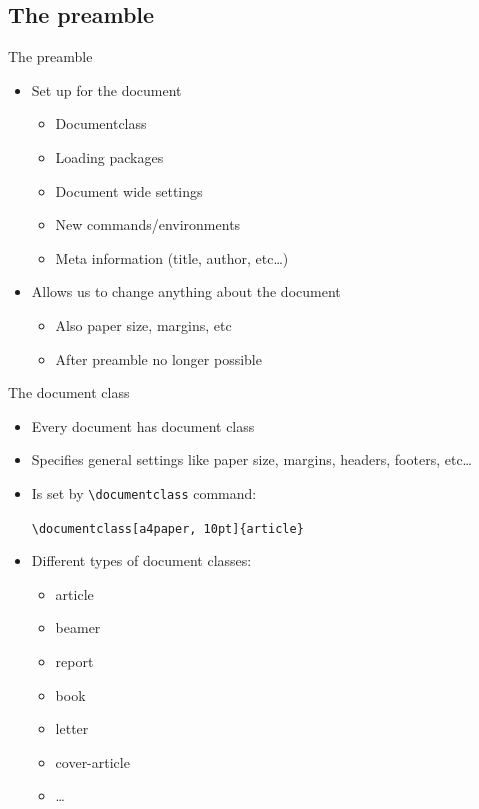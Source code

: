 \documentclass{beamer}
\begin{document}
\subsection{The preamble}
\begin{frame}{The preamble}
    \begin{itemize}
        \item Set up for the document
            \begin{itemize}
                \item Documentclass
                \item Loading packages
                \item Document wide settings
                \item New commands/environments
                \item Meta information (title, author, etc\ldots)
            \end{itemize}
        \item Allows us to change anything about the document
            \begin{itemize}
                \item Also paper size, margins, etc
                \item After preamble no longer possible
            \end{itemize}
    \end{itemize}
\end{frame}

\begin{frame}[fragile]{The document class}
    \begin{itemize}
        \item Every document has document class
        \item Specifies general settings like paper size, margins, headers,
            footers, etc\ldots
        \item Is set by \lstinline+\documentclass+ command:

            \lstinline+\documentclass[a4paper, 10pt]{article}+
        \item Different types of document classes:
            \begin{itemize}
                \item article
                \item beamer
                \item report
                \item book
                \item letter
                \item cover-article
                \item \ldots
            \end{itemize}
    \end{itemize}
\end{frame}
\end{document}

